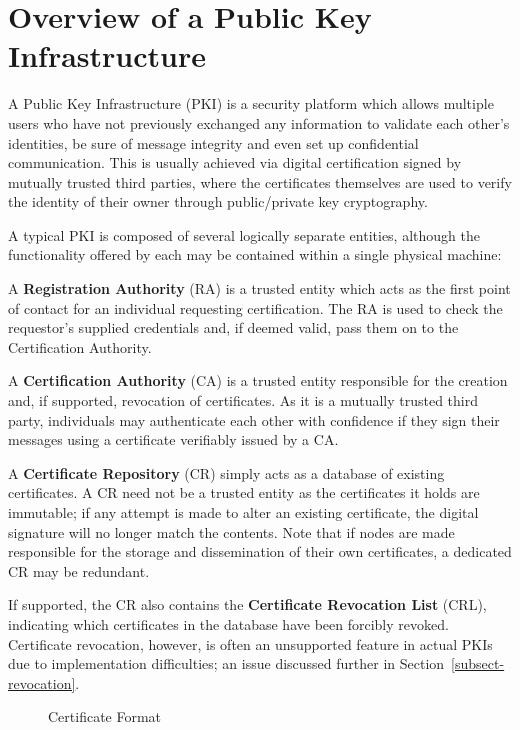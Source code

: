 \documentclass{elsart3p}
\begin{document}
\section{Overview of a Public Key Infrastructure}
\label{sect-pkioverview}

A Public Key Infrastructure (PKI) is a security platform which
allows multiple users who have not previously exchanged any
information to validate each other's identities, be sure of message
integrity and even set up confidential communication. This is
usually achieved via digital certification signed by mutually
trusted third parties, where the certificates themselves are used to
verify the identity of their owner through public/private key
cryptography.

A typical PKI is composed of several logically separate entities,
although the functionality offered by each may be contained within a
single physical machine:

A \textbf{Registration Authority} (RA) is a trusted entity which
acts as the first point of contact for an individual requesting
certification. The RA is used to check the requestor's supplied
credentials and, if deemed valid, pass them on to the Certification
Authority.

A \textbf{Certification Authority} (CA) is a trusted entity
responsible for the creation and, if supported, revocation of
certificates. As it is a mutually trusted third party, individuals
may authenticate each other with confidence if they sign their
messages using a certificate verifiably issued by a CA.

A \textbf{Certificate Repository} (CR) simply acts as a database of
existing certificates. A CR need not be a trusted entity as the
certificates it holds are immutable; if any attempt is made to alter
an existing certificate, the digital signature will no longer match
the contents. Note that if nodes are made responsible for the
storage and dissemination of their own certificates, a dedicated CR
may be redundant.

If supported, the CR also contains the \textbf{Certificate
Revocation List} (CRL), indicating which certificates in the
database have been forcibly revoked. Certificate revocation,
however, is often an unsupported feature in actual PKIs due to
implementation difficulties; an issue discussed further in
Section~\ref{subsect-revocation}.

\begin{figure}[tb]
\centering
{}
\caption{Certificate Format}
\label{fig:format}
\end{figure}
\end{document}
